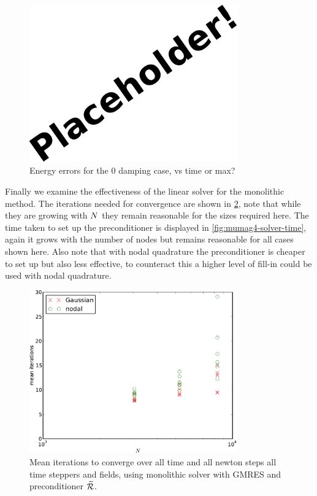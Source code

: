 \begin{figure}
  \centering
  \includegraphics[width=0.8\textwidth]{images/placeholder}
  \caption{Energy errors for the 0 damping case, vs time or max?}
  \label{fig:energy-conservation}
\end{figure}




Finally we examine the effectiveness of the linear solver for the monolithic method.
The iterations needed for convergence are shown in \cref{fig:mumag4-solver-iterations}, note that while they are growing with $N$ they remain reasonable for the sizes required here.
The time taken to set up the preconditioner is displayed in \cref{fig:mumag4-solver-time}, again it grows with the number of nodes but remains reasonable for all cases shown here.
Also note that with nodal quadrature the preconditioner is cheaper to set up but also less effective, to counteract this a higher level of fill-in could be used with nodal quadrature.

\begin{figure}
  \centering
  \includegraphics[width=0.8\textwidth]{plots/mumag4_monolithic_its/meanofnsolveritersvsinitialnnode.pdf}
  \caption{Mean iterations to converge over all time and all newton steps all time steppers and fields, using monolithic solver with GMRES and preconditioner $\widetilde{\mathcal{R}}$.}
  \label{fig:mumag4-solver-iterations}
\end{figure}


